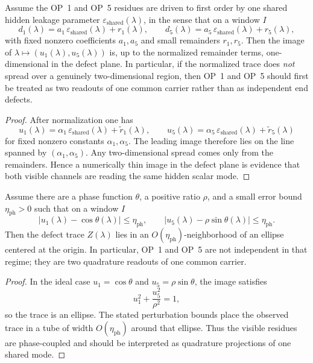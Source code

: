 \begin{proposition}
\label{prop:working-one-mode-image-test}
Assume the OP~1 and OP~5 residues are driven to first order by one shared hidden leakage parameter \(\varepsilon_{\mathrm{shared}}(\lambda)\), in the sense that on a window \(I\)
\[
 d_1(\lambda)=a_1\,\varepsilon_{\mathrm{shared}}(\lambda)+r_1(\lambda),
 \qquad
 d_5(\lambda)=a_5\,\varepsilon_{\mathrm{shared}}(\lambda)+r_5(\lambda),
\]
with fixed nonzero coefficients \(a_1,a_5\) and small remainders \(r_1,r_5\). Then the image of \(\lambda\mapsto (u_1(\lambda),u_5(\lambda))\) is, up to the normalized remainder terms, one-dimensional in the defect plane. In particular, if the normalized trace does \emph{not} spread over a genuinely two-dimensional region, then OP~1 and OP~5 should first be treated as two readouts of one common carrier rather than as independent end defects.
\end{proposition}

\begin{proof}
After normalization one has
\[
 u_1(\lambda)=\alpha_1\,\varepsilon_{\mathrm{shared}}(\lambda)+\tilde r_1(\lambda),
 \qquad
 u_5(\lambda)=\alpha_5\,\varepsilon_{\mathrm{shared}}(\lambda)+\tilde r_5(\lambda)
\]
for fixed nonzero constants \(\alpha_1,\alpha_5\). The leading image therefore lies on the line spanned by \((\alpha_1,\alpha_5)\). Any two-dimensional spread comes only from the remainders. Hence a numerically thin image in the defect plane is evidence that both visible channels are reading the same hidden scalar mode.
\end{proof}

\begin{proposition}
\label{prop:working-quadrature-criterion}
Assume there are a phase function \(\theta\), a positive ratio \(\rho\), and a small error bound \(\eta_{\mathrm{ph}}>0\) such that on a window \(I\)
\[
 |u_1(\lambda)-\cos\theta(\lambda)|\le \eta_{\mathrm{ph}},
 \qquad
 |u_5(\lambda)-\rho\sin\theta(\lambda)|\le \eta_{\mathrm{ph}}.
\]
Then the defect trace \(Z(\lambda)\) lies in an \(O(\eta_{\mathrm{ph}})\)-neighborhood of an ellipse centered at the origin. In particular, OP~1 and OP~5 are not independent in that regime; they are two quadrature readouts of one common carrier.
\end{proposition}

\begin{proof}
In the ideal case \(u_1=\cos\theta\) and \(u_5=\rho\sin\theta\), the image satisfies
\[
 u_1^2+\frac{u_5^2}{\rho^2}=1,
\]
so the trace is an ellipse. The stated perturbation bounds place the observed trace in a tube of width \(O(\eta_{\mathrm{ph}})\) around that ellipse. Thus the visible residues are phase-coupled and should be interpreted as quadrature projections of one shared mode.
\end{proof}

